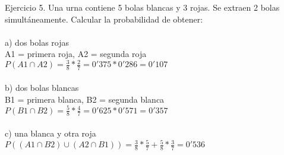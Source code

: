 \problem

Ejercicio 5. Una urna contiene 5 bolas blancas y 3 rojas. Se extraen 2 bolas simultáneamente. Calcular la probabilidad de obtener: \\ \\
a) dos bolas rojas \\
A1 = primera roja, A2 = segunda roja \\
$P(A1 \cap A2) = \frac{3}{8} * \frac{2}{7} = 0'375*0'286 = 0'107$ \\ \\
b) dos bolas blancas \\ 
B1 = primera blanca, B2 = segunda blanca \\
$P(B1 \cap B2) =  \frac{5}{8} * \frac{4}{7} = 0'625 * 0'571 = 0'357$ \\ \\
c) una blanca y otra roja \\
$P((A1 \cap B2)\cup (A2 \cap B1)) = \frac{3}{8}*\frac{5}{7} + \frac{5}{8}*\frac{3}{7} = 0'536$ \\
